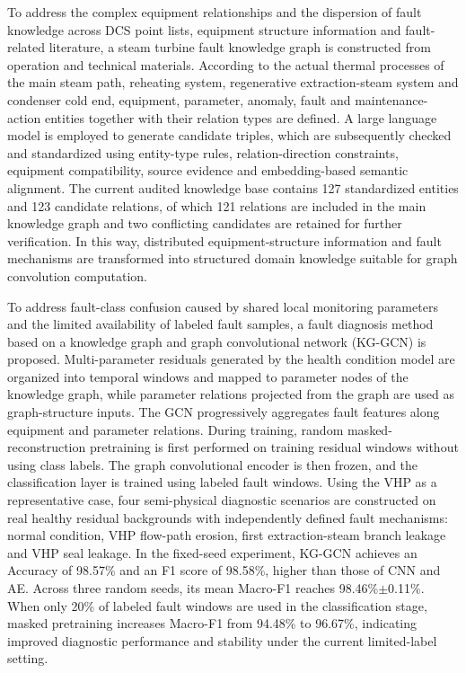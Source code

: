 To address the complex equipment relationships and the dispersion of fault knowledge across DCS point lists, equipment structure information and fault-related literature, a steam turbine fault knowledge graph is constructed from operation and technical materials. According to the actual thermal processes of the main steam path, reheating system, regenerative extraction-steam system and condenser cold end, equipment, parameter, anomaly, fault and maintenance-action entities together with their relation types are defined. A large language model is employed to generate candidate triples, which are subsequently checked and standardized using entity-type rules, relation-direction constraints, equipment compatibility, source evidence and embedding-based semantic alignment. The current audited knowledge base contains 127 standardized entities and 123 candidate relations, of which 121 relations are included in the main knowledge graph and two conflicting candidates are retained for further verification. In this way, distributed equipment-structure information and fault mechanisms are transformed into structured domain knowledge suitable for graph convolution computation.

To address fault-class confusion caused by shared local monitoring parameters and the limited availability of labeled fault samples, a fault diagnosis method based on a knowledge graph and graph convolutional network (KG-GCN) is proposed. Multi-parameter residuals generated by the health condition model are organized into temporal windows and mapped to parameter nodes of the knowledge graph, while parameter relations projected from the graph are used as graph-structure inputs. The GCN progressively aggregates fault features along equipment and parameter relations. During training, random masked-reconstruction pretraining is first performed on training residual windows without using class labels. The graph convolutional encoder is then frozen, and the classification layer is trained using labeled fault windows. Using the VHP as a representative case, four semi-physical diagnostic scenarios are constructed on real healthy residual backgrounds with independently defined fault mechanisms: normal condition, VHP flow-path erosion, first extraction-steam branch leakage and VHP seal leakage. In the fixed-seed experiment, KG-GCN achieves an Accuracy of 98.57\% and an F1 score of 98.58\%, higher than those of CNN and AE. Across three random seeds, its mean Macro-F1 reaches 98.46\%$\pm$0.11\%. When only 20\% of labeled fault windows are used in the classification stage, masked pretraining increases Macro-F1 from 94.48\% to 96.67\%, indicating improved diagnostic performance and stability under the current limited-label setting.

